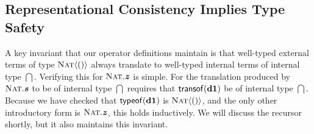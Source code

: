 
%
\subsection{Representational Consistency Implies Type Safety}\label{repcon}
A key invariant that our operator definitions maintain is that well-typed external terms of type $\textsc{Nat}\langle()\rangle$ always translate to well-typed internal terms of internal type $\dint$. Verifying this for $\textsc{Nat}.\textbf{\textit{z}}$ is simple. For the translation produced by $\textsc{Nat}.\textbf{\textit{s}}$ to be of internal type $\dint$ requires that ${\sf transof}({\textbf{d1}})$ be of internal type $\dint$. Because we have checked that ${\sf typeof}({\textbf{d1}})$ is $\textsc{Nat}\langle()\rangle$, and the only other introductory form is $\textsc{Nat}.\textbf{\textit{z}}$, this holds inductively. We will discuss the recursor shortly, but it also maintains this invariant.

